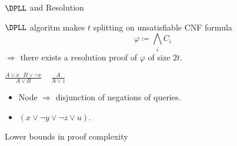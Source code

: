 \begin{frame}{$\DPLL$ and Resolution}
    
    \begin{theorem}
        $\DPLL$ algoritm makes $t$ splitting on \alert{unsatisfiable} CNF formula
        $$\varphi \coloneqq \bigwedge\limits_i C_i$$
        $\Rightarrow$ there exists a resolution proof of $\varphi$ of size $2t$.
    \end{theorem}

    \pause

    \begin{minipage}{0.58\linewidth}
        \centering
        
    \end{minipage}
    \pause
    \begin{minipage}{0.4\linewidth}
        \centering
        $\frac{A \lor x ~~~ B \lor \neg x}{A \lor B} ~~~~~ \frac{A}{A \lor z}$
        \begin{itemize}
            \item Node $\Rightarrow$ disjunction of negations of queries.
            \item $(x \lor \neg y \lor \neg z \lor u)$.
        \end{itemize}
    \end{minipage}

\end{frame}

\begin{frame}{Lower bounds in proof complexity}

    
    
\end{frame}

